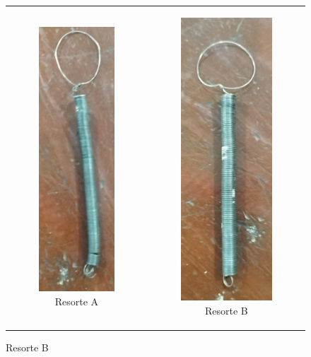 \documentclass[../main.tex]{subfiles}
\begin{document}
\begin{figure}[H]
\begin{tabular}{c c}
    \begin{subfigure}{0.5\textwidth} 
        \centering
        \includegraphics[height=0.8\linewidth,angle=90]{images/materiales/mat5.jpg}
        \caption{Resorte A}
        \label{fig:resortea}
    \end{subfigure}
    &
    \begin{subfigure}{0.5\textwidth}  
        \centering
        \includegraphics[height=0.8\linewidth,angle=90]{images/materiales/mat6.jpg}
        \caption{Resorte B}
        \label{fig:resorteb}
    \end{subfigure} \\
    

\end{tabular}
\end{figure}
\end{document}
